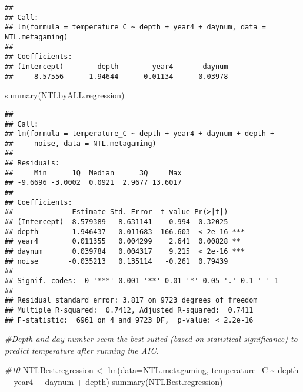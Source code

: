 \documentclass[
]{article}
\newenvironment{Shaded}{\begin{snugshade}}{\end{snugshade}}
\newcommand{\AttributeTok}[1]{\textcolor[rgb]{0.77,0.63,0.00}{#1}}
\newcommand{\CommentTok}[1]{\textcolor[rgb]{0.56,0.35,0.01}{\textit{#1}}}
\newcommand{\FunctionTok}[1]{\textcolor[rgb]{0.00,0.00,0.00}{#1}}
\newcommand{\NormalTok}[1]{#1}
\newcommand{\OtherTok}[1]{\textcolor[rgb]{0.56,0.35,0.01}{#1}}
\newcommand{\SpecialCharTok}[1]{\textcolor[rgb]{0.00,0.00,0.00}{#1}}
\begin{document}
\begin{verbatim}
## 
## Call:
## lm(formula = temperature_C ~ depth + year4 + daynum, data = NTL.metagaming)
## 
## Coefficients:
## (Intercept)        depth        year4       daynum  
##    -8.57556     -1.94644      0.01134      0.03978
\end{verbatim}

\begin{Shaded}
\begin{Highlighting}[]
\FunctionTok{summary}\NormalTok{(NTLbyALL.regression)}
\end{Highlighting}
\end{Shaded}

\begin{verbatim}
## 
## Call:
## lm(formula = temperature_C ~ depth + year4 + daynum + depth + 
##     noise, data = NTL.metagaming)
## 
## Residuals:
##     Min      1Q  Median      3Q     Max 
## -9.6696 -3.0002  0.0921  2.9677 13.6017 
## 
## Coefficients:
##              Estimate Std. Error  t value Pr(>|t|)    
## (Intercept) -8.579389   8.631141   -0.994  0.32025    
## depth       -1.946437   0.011683 -166.603  < 2e-16 ***
## year4        0.011355   0.004299    2.641  0.00828 ** 
## daynum       0.039784   0.004317    9.215  < 2e-16 ***
## noise       -0.035213   0.135114   -0.261  0.79439    
## ---
## Signif. codes:  0 '***' 0.001 '**' 0.01 '*' 0.05 '.' 0.1 ' ' 1
## 
## Residual standard error: 3.817 on 9723 degrees of freedom
## Multiple R-squared:  0.7412, Adjusted R-squared:  0.7411 
## F-statistic:  6961 on 4 and 9723 DF,  p-value: < 2.2e-16
\end{verbatim}

\begin{Shaded}
\begin{Highlighting}[]
\CommentTok{\#Depth and day number seem the best suited (based on statistical significance) to predict temperature after running the AIC. }

\CommentTok{\#10}
\NormalTok{NTLBest.regression }\OtherTok{\textless{}{-}} \FunctionTok{lm}\NormalTok{(}\AttributeTok{data=}\NormalTok{NTL.metagaming, temperature\_C }\SpecialCharTok{\textasciitilde{}}\NormalTok{ depth }\SpecialCharTok{+}\NormalTok{ year4 }\SpecialCharTok{+}\NormalTok{ daynum }\SpecialCharTok{+}\NormalTok{ depth)}
\FunctionTok{summary}\NormalTok{(NTLBest.regression)}
\end{Highlighting}
\end{Shaded}
\end{document}
